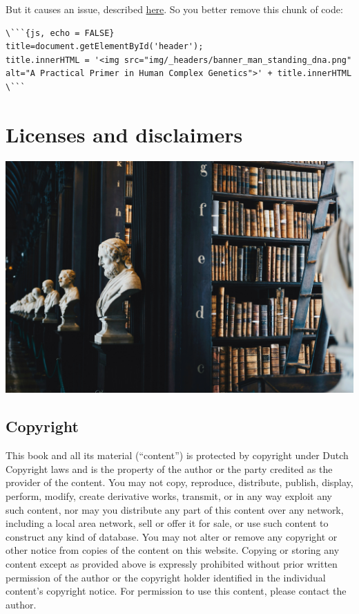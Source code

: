 \documentclass[
]{book}
\begin{document}
But it causes an issue, described \href{https://www.mobileread.com/forums/showthread.php?t=206086}{here}. So you better remove this chunk of code:

\begin{lstlisting}
\```{js, echo = FALSE}
title=document.getElementById('header');
title.innerHTML = '<img src="img/_headers/banner_man_standing_dna.png" alt="A Practical Primer in Human Complex Genetics">' + title.innerHTML
\```
\end{lstlisting}

\hypertarget{license}{%
\chapter{Licenses and disclaimers}\label{license}}

\includegraphics[width=1\textwidth,height=\textheight]{img/_headers/licenses.png}

\hypertarget{copyright}{%
\section{Copyright}\label{copyright}}

This book and all its material (``content'') is protected by copyright under Dutch Copyright laws and is the property of the author or the party credited as the provider of the content. You may not copy, reproduce, distribute, publish, display, perform, modify, create derivative works, transmit, or in any way exploit any such content, nor may you distribute any part of this content over any network, including a local area network, sell or offer it for sale, or use such content to construct any kind of database. You may not alter or remove any copyright or other notice from copies of the content on this website. Copying or storing any content except as provided above is expressly prohibited without prior written permission of the author or the copyright holder identified in the individual content's copyright notice. For permission to use this content, please contact the author.
\end{document}
